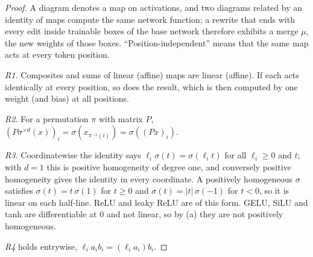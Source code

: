 \begin{proof}
A diagram denotes a map on activations, and two diagrams related by an identity of maps compute the same network function;
a rewrite that ends with every edit inside trainable boxes of the base network therefore exhibits a merge $\mu$, the new
weights of those boxes. ``Position-independent'' means that the same map acts at every token position.

\emph{R1.} Composites and sums of linear (affine) maps are linear (affine). If each acts identically at every position, so
does the result, which is then computed by one weight (and bias) at all positions.

\emph{R2.} For a permutation $\pi$ with matrix $P$, $(P\sigma^{\times d}(x))_i=\sigma(x_{\pi^{-1}(i)})=\sigma((Px)_i)$.

\emph{R3.} Coordinatewise the identity says $\ell_i\sigma(t)=\sigma(\ell_it)$ for all $\ell_i\ge0$ and $t$; with $d=1$ this is
positive homogeneity of degree one, and conversely positive homogeneity gives the identity in every coordinate. A positively
homogeneous $\sigma$ satisfies $\sigma(t)=t\,\sigma(1)$ for $t\ge0$ and $\sigma(t)=\lvert t\rvert\,\sigma(-1)$ for $t<0$, so it
is linear on each half-line. ReLU and leaky ReLU are of this form. GELU, SiLU and tanh are differentiable at $0$ and not
linear, so by (a) they are not positively homogeneous.

\emph{R4} holds entrywise, $\ell_ia_ib_i=(\ell_ia_i)b_i$.


\end{proof}

